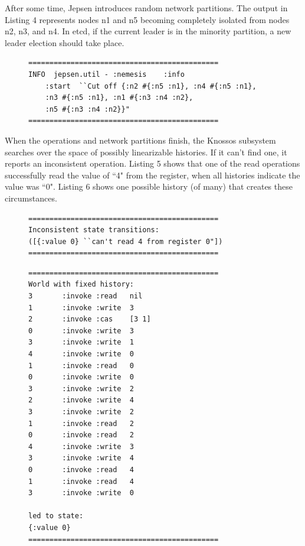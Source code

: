 \documentclass[12pt,conference]{IEEEtran}
\begin{document}
After some time, Jepsen introduces random network partitions. The output in Listing 4 represents nodes n1 and n5 becoming completely isolated from nodes n2, n3, and n4. In etcd, if the current leader is in the minority partition, a new leader election should take place.

\begin{figure}[!t]
    \scriptsize
\begin{lstlisting}[caption={Network Partition},label={networkPartition}]
=============================================
INFO  jepsen.util - :nemesis    :info   
	:start  ``Cut off {:n2 #{:n5 :n1}, :n4 #{:n5 :n1}, 
	:n3 #{:n5 :n1}, :n1 #{:n3 :n4 :n2}, 
	:n5 #{:n3 :n4 :n2}}"
=============================================
\end{lstlisting}
\end{figure}

When the operations and network partitions finish, the Knossos subsystem searches over the space of possibly linearizable histories. If it can't find one, it reports an inconsistent operation. Listing 5 shows that one of the read operations successfully read the value of ``4" from the register, when all histories indicate the value was ``0". Listing 6 shows one possible history (of many) that creates these circumstances.

\begin{figure}[!t]
    \scriptsize
\begin{lstlisting}[caption={Failure Result},label={failureResult}]
=============================================
Inconsistent state transitions:
([{:value 0} ``can't read 4 from register 0"])
=============================================
\end{lstlisting}
\end{figure}

\begin{figure}[!t]
    \scriptsize
\begin{lstlisting}[caption={Non-linearizable History},label={nlHistory}]
=============================================
World with fixed history:
3       :invoke :read   nil
1       :invoke :write  3
2       :invoke :cas    [3 1]
0       :invoke :write  3
3       :invoke :write  1
4       :invoke :write  0
1       :invoke :read   0
0       :invoke :write  0
3       :invoke :write  2
2       :invoke :write  4
3       :invoke :write  2
1       :invoke :read   2
0       :invoke :read   2
4       :invoke :write  3
3       :invoke :write  4
0       :invoke :read   4
1       :invoke :read   4
3       :invoke :write  0

led to state:
{:value 0}
=============================================
\end{lstlisting}
\end{figure}
\end{document}
